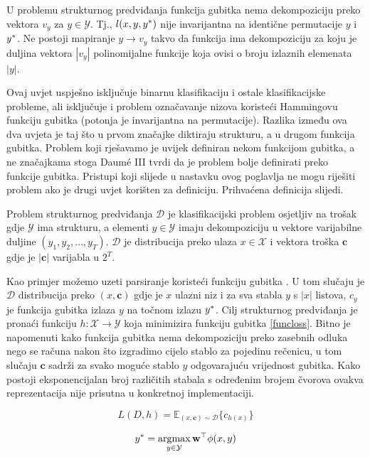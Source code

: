 \begin{condition} U problemu strukturnog predviđanja funkcija gubitka nema
dekompoziciju preko vektora $v_y$ za $y \in \mathcal{Y}$. Tj., $l(x, y,
y\ssymbol{1})$ nije invarijantna na identične permutacije $y$ i $y\ssymbol{1}$.
Ne postoji mapiranje $y \to v_y$ takvo da funkcija ima dekompoziciju za koju je
duljina vektora $|v_y|$ polinomijalne funkcije koja ovisi o broju izlaznih
elemenata $|y|$. \end{condition}

Ovaj uvjet uspješno isključuje binarnu klasifikaciju i ostale klasifikacijske
probleme, ali isključuje i problem označavanje nizova koristeći Hammingovu
funkciju gubitka (potonja je invarijantna na permutacije). Razlika između ova
dva uvjeta je taj što u prvom značajke diktiraju strukturu, a u drugom funkcija
gubitka. Problem koji rješavamo je uvijek definiran nekom funkcijom gubitka, a
ne značajkama stoga Daum\'e III tvrdi da je problem bolje definirati preko
funkcije gubitka. Pristupi koji slijede u nastavku ovog poglavlja ne mogu
riješiti problem ako je drugi uvjet korišten za definiciju. Prihvaćena
definicija slijedi.

\begin{definition} \label{jointlearndef}

  Problem strukturnog predviđanja $\mathcal{D}$ je klasifikacijski problem
  osjetljiv na trošak  gdje
  $\mathcal{Y}$ ima strukturu, a elementi $y \in \mathcal{Y}$ imaju
  dekompoziciju u vektore varijabilne duljine $(y_1, y_2, \ldots, y_T)$.
  $\mathcal{D}$ je distribucija preko ulaza $x \in \mathcal{X}$ i vektora troška
  $\mathbf{c}$ gdje je $|\mathbf{c}|$ varijabla u $2^T$.

\end{definition}

Kao primjer možemo uzeti parsiranje koristeći funkciju gubitka
. U tom slučaju je $\mathcal{D}$ distribucija preko $(x,
\mathbf{c})$ gdje je $x$ ulazni niz i za sva stabla $y$ s $|x|$ listova, $c_y$
je funkcija gubitka  izlaza $y$ na točnom izlazu
$y\ssymbol{1}$. Cilj strukturnog predviđanja je pronaći funkciju $h: \mathcal{X}
\rightarrow \mathcal{Y}$ koja minimizira funkciju gubitka \ref{funcloss}. Bitno
je napomenuti kako funkcija gubitka  nema dekompoziciju
preko zasebnih odluka nego se računa nakon što izgradimo cijelo stablo za
pojedinu rečenicu, u tom slučaju $\mathbf{c}$ sadrži za svako moguće stablo $y$
odgovarajuću vrijednost  gubitka. Kako postoji
eksponencijalan broj različitih stabala s određenim brojem čvorova ovakva
reprezentacija nije prisutna u konkretnoj implementaciji.

\begin{equation} \label{funcloss}
  L(D, h) = \mathbb{E}_{(x, \mathbf{c}) \sim \mathcal{D}} \{c_{h(x)}\}
\end{equation}



\begin{equation}
  y\ssymbol{1} = \argmax_{y \in \mathcal{Y}} \mathbf{w}^\top \phi(x, y)
\end{equation}
